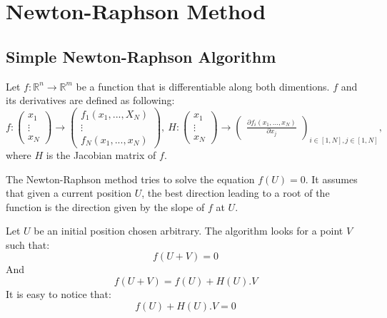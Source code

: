 
\section{Newton-Raphson Method}
\subsection{Simple Newton-Raphson Algorithm}

Let $f:\mathbb{R}^{n}\rightarrow \mathbb{R}^{m}$ be a function that is differentiable along both dimentions. $f$ and its derivatives are defined as following:
\[f: 
\begin{pmatrix}
    x_1\\
    \vdots\\
    x_N
  \end{pmatrix} 
  \rightarrow
  \begin{pmatrix}
    f_1(x_1,...,X_N)\\
    \vdots\\
    f_N(x_1,...,x_N)
  \end{pmatrix},\ 
  H: \begin{pmatrix}
    x_1\\
    \vdots\\
    x_N
  \end{pmatrix}
  \rightarrow
  \begin{pmatrix}
    \frac{\partial f_i(x_1,...,x_N)}{\partial x_j}
  \end{pmatrix}_{i \in [1,N], j \in[1,N]},
\]
where $H$ is the Jacobian matrix of $f$. 

The Newton-Raphson method tries to solve the equation $f(U) = 0$. It assumes that given a current position $U$, the best direction leading to a root of the function is the direction given by the slope of $f$ at $U$.

Let $U$ be an initial position chosen arbitrary. The algorithm looks for a point $V$ such that:
\[
f(U+V) = 0
\]
And
\begin{equation}
f(U+V) = f(U) + H(U).V
\label{eq:equation1}
\end{equation}
It is easy to notice that:
\begin{equation}
f(U) + H(U).V = 0
\label{eq:equation2}
\end{equation}

